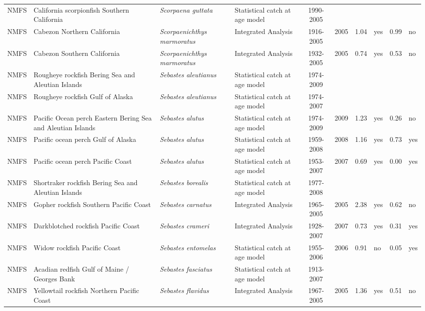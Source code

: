 \begin{longtable}{p{1.8cm}p{3.5cm}p{3.5cm}p{3cm}cccp{0.9cm}cp{0.9cm}}
  NMFS & California scorpionfish Southern California & \textit{Scorpaena guttata} & Statistical catch at age model & 1990-2005 &  &  &  &  &  \\ 
  NMFS & Cabezon Northern California & \textit{Scorpaenichthys marmoratus} & Integrated Analysis & 1916-2005 & 2005 & 1.04 & yes & 0.99 & no \\ 
  NMFS & Cabezon Southern California & \textit{Scorpaenichthys marmoratus} & Integrated Analysis & 1932-2005 & 2005 & 0.74 & yes & 0.53 & no \\ 
  NMFS & Rougheye rockfish Bering Sea and Aleutian Islands & \textit{Sebastes aleutianus} & Statistical catch at age model & 1974-2009 &  &  &  &  &  \\ 
  NMFS & Rougheye rockfish Gulf of Alaska & \textit{Sebastes aleutianus} & Statistical catch at age model & 1974-2007 &  &  &  &  &  \\ 
  NMFS & Pacific Ocean perch Eastern Bering Sea and Aleutian Islands & \textit{Sebastes alutus} & Statistical catch at age model & 1974-2009 & 2009 & 1.23 & yes & 0.26 & no \\ 
  NMFS & Pacific ocean perch Gulf of Alaska & \textit{Sebastes alutus} & Statistical catch at age model & 1959-2008 & 2008 & 1.16 & yes & 0.73 & yes \\ 
  NMFS & Pacific ocean perch Pacific Coast & \textit{Sebastes alutus} & Statistical catch at age model & 1953-2007 & 2007 & 0.69 & yes & 0.00 & yes \\ 
  NMFS & Shortraker rockfish Bering Sea and Aleutian Islands & \textit{Sebastes borealis} & Statistical catch at age model & 1977-2008 &  &  &  &  &  \\ 
  NMFS & Gopher rockfish Southern Pacific Coast & \textit{Sebastes carnatus} & Integrated Analysis & 1965-2005 & 2005 & 2.38 & yes & 0.62 & no \\ 
  NMFS & Darkblotched rockfish Pacific Coast & \textit{Sebastes crameri} & Integrated Analysis & 1928-2007 & 2007 & 0.73 & yes & 0.31 & yes \\ 
  NMFS & Widow rockfish Pacific Coast & \textit{Sebastes entomelas} & Statistical catch at age model & 1955-2006 & 2006 & 0.91 & no & 0.05 & yes \\ 
  NMFS & Acadian redfish Gulf of Maine / Georges Bank & \textit{Sebastes fasciatus} & Statistical catch at age model & 1913-2007 &  &  &  &  &  \\ 
  NMFS & Yellowtail rockfish Northern Pacific Coast & \textit{Sebastes flavidus} & Integrated Analysis & 1967-2005 & 2005 & 1.36 & yes & 0.51 & no \\ 

\end{longtable}

